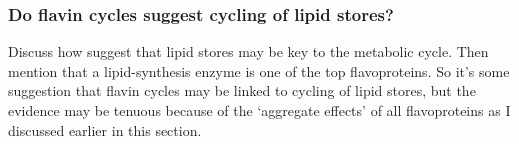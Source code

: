 

\subsubsection{Do flavin cycles suggest cycling of lipid stores?}
\label{subsubsec:intro-flavin-ymc-lipid_cycling}

Discuss how \citet{campbellBuildingBlocksAre2020} suggest that lipid stores may be key to the metabolic cycle.
Then mention that a lipid-synthesis enzyme is one of the top flavoproteins.
So it's some suggestion that flavin cycles may be linked to cycling of lipid stores, but the evidence may be tenuous because of the `aggregate effects' of all flavoproteins as I discussed earlier in this section.

